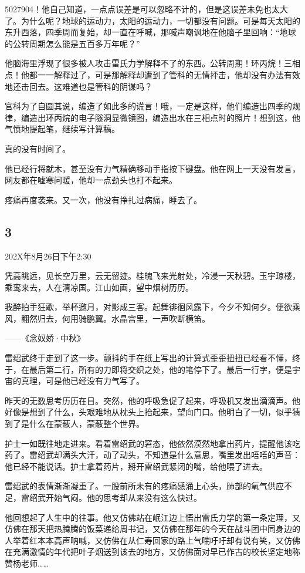 \documentclass[UTF8,12pt,oneside]{ctexbook}
\begin{document}
5027904！他自己知道，一点点误差是可以忽略不计的，但是这误差未免也太大了。为什么呢？地球的运动力，太阳的运动力，一切都没有问题。可是每天太阳的东升西落，四季周而复始，却一直在呼喊，那喊声嘲讽地在他脑子里回响：“地球的公转周期怎么能是五百多万年呢？”

他脑海里浮现了很多被人攻击雷氏力学解释不了的东西。公转周期！环丙烷！三相点！他都一一解释过了，可是那解释却遭到了管科的无情抨击，他却没有办法有效地还击回去。这难道也是管科的阴谋吗？

官科为了自圆其说，编造了如此多的谎言！哦，一定是这样，他们编造出四季的规律，编造出环丙烷的电子隧洞显微镜图，编造出水在三相点时的照片！想到这，他气愤地提起笔，继续写计算稿。

真的没有时间了。

他已经行将就木，甚至没有力气精确移动手指按下键盘。他在网上一天没有发言，网友都在嘘寒问暖，他却一点劲头也打不起来。

疼痛再度袭来。又一次，他没有挣扎过病痛，睡去了。

\subsection{3}
202X年8月26日下午2:30

\kaishu
凭高眺远，见长空万里，云无留迹。桂魄飞来光射处，冷浸一天秋碧。玉宇琼楼，乘鸾来去，人在清凉国。江山如画，望中烟树历历。

我醉拍手狂歌，举杯邀月，对影成三客。起舞徘徊风露下，今夕不知何夕。便欲乘风，翻然归去，何用骑鹏翼。水晶宫里，一声吹断横笛。

\hfill{——《念奴娇·中秋》}

\songti
雷绍武终于走到了这一步。颤抖的手在纸上写出的计算式歪歪扭扭已经看不懂，终于，在最后第二行，所有的力即将交织之处，他的笔停下了。最后一行字，便是宇宙的真理，可是他已经没有力气写了。

昨天的无数思考历历在目。突然，他的呼吸急促了起来，呼吸机又发出滴滴声。他好像是想到了什么，头艰难地从枕头上抬起来，望向门口。他明白了一切，似乎猜到了是什么在蒙蔽人，蒙蔽整个世界。

护士一如既往地走进来。看着雷绍武的窘态，他依然漠然地拿出药片，提醒他该吃药了。雷绍武却满头大汗，动了动头，不知道是什么意思，嘴里发出唔唔的声音：他已经不能说话。护士拿着药片，掰开雷绍武紧闭的嘴，给他喂了进去。

雷绍武的表情渐渐凝重了。一股前所未有的疼痛感涌上心头，肺部的氧气供应不足，雷绍武开始气闷。他的思考却从来没有这么快过。

他回想起了人生中的往事。他又仿佛站在岷江边上悟出雷氏力学的第一条定理，又仿佛在那天把热腾腾的饭菜递给周书记，又仿佛在那年的今天在战斗团中同身边的人举着红本本高声呐喊，又仿佛在从仁寿回家的路上气喘吁吁却有说有笑，又仿佛在充满激情的年代把叶子烟送到该去的地方，又仿佛面对早已作古的校长坚定地称赞杨老师……
\end{document}
